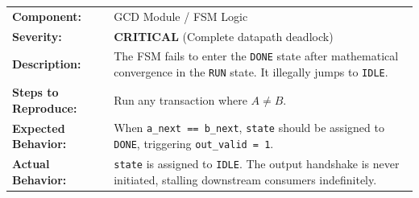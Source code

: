 \begin{tcolorbox}[
  colback=white,
  colframe=gray!60!black,
  title=\textbf{\textsf{[BUG-001] Premature IDLE Transition (Skipping DONE State)}},
  fonttitle=\large\bfseries\sffamily,
  colbacktitle=gray!15,
  coltitle=black,
  boxrule=1pt,
  arc=4pt
]
\sffamily %
\renewcommand{\arraystretch}{1.5} %
\begin{tabular}{@{} p{} p{} @{}}
    \textbf{Component:} & GCD Module / FSM Logic \\
    \textbf{Severity:} & \textcolor{red!80!black}{\textbf{CRITICAL}} (Complete datapath deadlock) \\
    \textbf{Description:} & The FSM fails to enter the \texttt{DONE} state after mathematical convergence in the \texttt{RUN} state. It illegally jumps to \texttt{IDLE}. \\
    \textbf{Steps to Reproduce:} & Run any transaction where $A \neq B$. \\
    \textbf{Expected Behavior:} & When \texttt{a\_next == b\_next}, \texttt{state} should be assigned to \texttt{DONE}, triggering \texttt{out\_valid = 1}. \\
    \textbf{Actual Behavior:} & \texttt{state} is assigned to \texttt{IDLE}. The output handshake is never initiated, stalling downstream consumers indefinitely. \\
\end{tabular}
\end{tcolorbox}